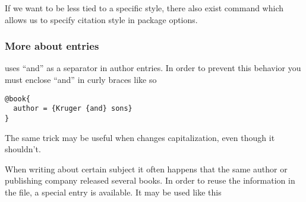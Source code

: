 If we want to be less tied to a specific style, there also exist 
command which allows us to specify citation style in package options.




\subsubsection{More about entries}

 uses ``and'' as a separator in author entries. In order to prevent
this behavior you must enclose ``and'' in curly braces like so
\begin{verbatim}
@book{
  author = {Kruger {and} sons}
}
\end{verbatim}
The same trick may be useful when  changes capitalization, even
though it shouldn't.

When writing about certain subject it often happens that the same author or
publishing company released several books. In order to reuse the information in
the  file, a special entry  is available. It may be used
like this



